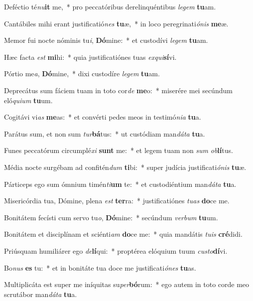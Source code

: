 \item Deféctio té\textit{nu}\textbf{it} me,~* pro peccatóribus derelinquéntibus \textit{le}\textit{gem} \textbf{tu}am.
\item Cantábiles mihi erant justificatió\textit{nes} \textbf{tu}æ,~* in loco peregrinati\textit{ó}\textit{nis} \textbf{me}æ.
\item Memor fui nocte nóminis tu\textit{i}, \textbf{Dó}mine:~* et custodívi \textit{le}\textit{gem} \textbf{tu}am.
\item Hæc facta \textit{est} \textbf{mi}hi:~* quia justificatiónes tuas \textit{ex}\textit{qui}\textbf{sí}vi.
\item Pórtio me\textit{a}, \textbf{Dó}mine,~* dixi custodíre \textit{le}\textit{gem} \textbf{tu}am.
\item Deprecátus sum fáciem tuam in toto cor\textit{de} \textbf{me}o:~* miserére mei secúndum eló\textit{qui}\textit{um} \textbf{tu}um.
\item Cogitávi vi\textit{as} \textbf{me}as:~* et convérti pedes meos in testimó\textit{ni}\textit{a} \textbf{tu}a.
\item Parátus sum, et non sum \textit{tur}\textbf{bá}tus:~* ut custódiam man\textit{dá}\textit{ta} \textbf{tu}a.
\item Funes peccatórum circumplé\textit{xi} \textbf{sunt} me:~* et legem tuam non \textit{sum} \textit{ob}\textbf{lí}tus.
\item Média nocte surgébam ad confitén\textit{dum} \textbf{ti}bi:~* super judícia justificati\textit{ó}\textit{nis} \textbf{tu}æ.
\item Párticeps ego sum ómnium timén\textit{ti}\textbf{um} te:~* et custodiéntium man\textit{dá}\textit{ta} \textbf{tu}a.
\item Misericórdia tua, Dómine, plena \textit{est} \textbf{ter}ra:~* justificatiónes \textit{tu}\textit{as} \textbf{do}ce me.
\item Bonitátem fecísti cum servo tu\textit{o}, \textbf{Dó}mine:~* secúndum \textit{ver}\textit{bum} \textbf{tu}um.
\item Bonitátem et disciplínam et sciénti\textit{am} \textbf{do}ce me:~* quia mandátis \textit{tu}\textit{is} \textbf{cré}didi.
\item Priúsquam humiliárer ego \textit{de}\textbf{lí}qui:~* proptérea elóquium tuum \textit{cus}\textit{to}\textbf{dí}vi.
\item Bo\textit{nus} \textbf{es} tu:~* et in bonitáte tua doce me justificati\textit{ó}\textit{nes} \textbf{tu}as.
\item Multiplicáta est super me iníquitas su\textit{per}\textbf{bó}rum:~* ego autem in toto corde meo scrutábor man\textit{dá}\textit{ta} \textbf{tu}a.
